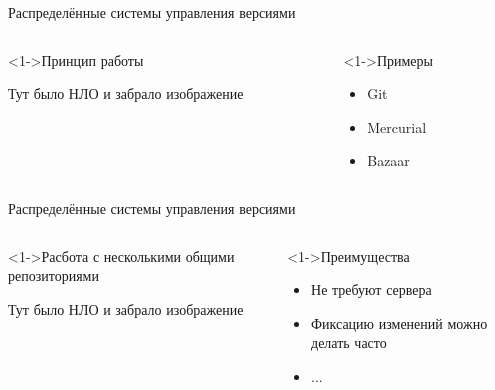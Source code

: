 \documentclass[pdf,9pt,aspectratio=169,xcolor={dvipsnames}]{beamer}
\begin{document}
\begin{frame}{Распределённые системы управления версиями}
  \begin{columns}[T]
    \begin{column}[]{0.45\textwidth}  
      \begin{exampleblock}<1->{Принцип работы}
        \begin{center}
           \Huge Тут было НЛО и забрало изображение
        \end{center}
      \end{exampleblock}
    \end{column}
    \begin{column}[]{0.45\textwidth}  
      \begin{block}<1->{Примеры}
        \begin{itemize}
          \item Git
          \item Mercurial
          \item Bazaar
        \end{itemize}
      \end{block}
    \end{column}
  \end{columns}
  \vfill
\end{frame}

\begin{frame}{Распределённые системы управления версиями}
  \begin{columns}[T]
    \begin{column}[]{0.45\textwidth}  
      \begin{exampleblock}<1->{Расбота с несколькими общими репозиториями}
        \begin{center}
           \Huge Тут было НЛО и забрало изображение
        \end{center}
      \end{exampleblock}
    \end{column}
    \begin{column}[]{0.45\textwidth}  
      \begin{block}<1->{Преимущества}
        \begin{itemize}
          \item Не требуют сервера
          \item Фиксацию изменений можно делать часто
          \item ...
        \end{itemize}
      \end{block}
    \end{column}
  \end{columns}
  \vfill
\end{frame}
\end{document}
